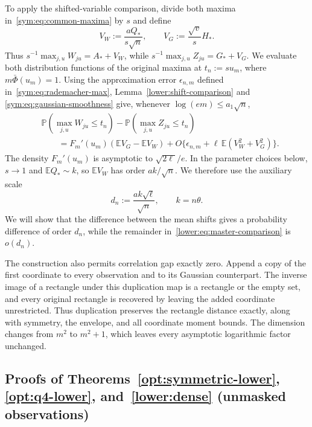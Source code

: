 \documentclass[11pt,letterpaper]{article}
\theoremstyle{remark}
\newcommand{\E}{\mathbb E}
\newcommand{\Pp}{\mathbb P}
\begin{document}
To apply the shifted-variable comparison, divide both maxima
in~\eqref{sym:eq:common-maxima} by \(s\) and define
\[
 V_W:=\frac{aQ_*}{s\sqrt n},\qquad
 V_G:=\frac{\sqrt v}{s}H_*.
\]
Thus \(s^{-1}\max_{j,u}W_{ju}=A_*+V_W\), while
\(s^{-1}\max_{j,u}Z_{ju}=G_*+V_G\). We evaluate both distribution
functions of the original maxima at \(t_n:=su_m\), where
\(m\bar\Phi(u_m)=1\).
Using the approximation error \(\epsilon_{n,m}\) defined
in~\eqref{sym:eq:rademacher-max},
Lemma~\ref{lower:shift-comparison} and
\eqref{sym:eq:gaussian-smoothness} give, whenever
\(\log(em)\le a_1\sqrt n\),
\begin{equation}
\begin{split}
 &\Pp(\max_{j,u}W_{ju}\le t_n)-\Pp(\max_{j,u}Z_{ju}\le t_n)\\
 &\qquad=F_m'(u_m)(\E V_G-\E V_W)
       +O\{\epsilon_{n,m}+\ell\,\E(V_W^2+V_G^2)\}.
\end{split}
 \label{lower:eq:master-comparison}
\end{equation}
The density \(F_m'(u_m)\) is asymptotic to \(\sqrt{2\ell}/e\).
In the parameter choices below, \(s\to1\) and \(\E Q_*\sim k\),
so \(\E V_W\) has order \(ak/\sqrt n\).
We therefore use the auxiliary scale
\begin{equation}
 d_n:=\frac{ak\sqrt\ell}{\sqrt n},\qquad k=n\theta.
 \label{lower:eq:proof-scale}
\end{equation}
We will show that the difference between the mean shifts gives a
probability difference of order \(d_n\), while the remainder
in~\eqref{lower:eq:master-comparison} is \(o(d_n)\).


The construction also permits correlation gap
exactly zero. Append a copy of the first coordinate to every
observation and to its Gaussian counterpart. The inverse image of
a rectangle under this duplication map is a rectangle or the empty
set, and every original rectangle is recovered by leaving the added
coordinate unrestricted. Thus duplication preserves the rectangle
distance exactly, along with symmetry, the envelope, and all
coordinate moment bounds. The dimension changes from \(m^2\) to
\(m^2+1\), which leaves every asymptotic logarithmic factor unchanged.

\subsection{Proofs of Theorems~\ref*{opt:symmetric-lower}, \ref*{opt:q4-lower}, and~\ref*{lower:dense} (unmasked observations)}
\label{app:symmetric-lower}
\end{document}
